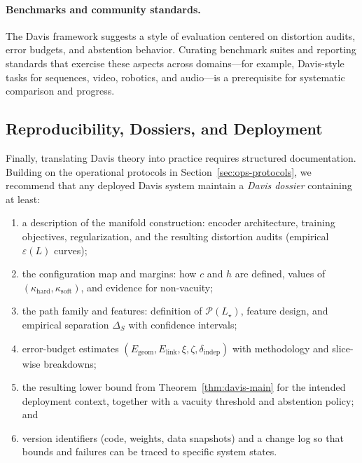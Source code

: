 \documentclass[11pt]{article}
\begin{document}
\paragraph{Benchmarks and community standards.}
The Davis framework suggests a style of evaluation centered on distortion audits, error budgets,
and abstention behavior. Curating benchmark suites and reporting standards that exercise these
aspects across domains---for example, Davis-style tasks for sequences, video, robotics, and audio---is
a prerequisite for systematic comparison and progress.

\subsection{Reproducibility, Dossiers, and Deployment}

Finally, translating Davis theory into practice requires structured documentation. Building on the
operational protocols in Section~\ref{sec:ops-protocols}, we recommend that any deployed Davis
system maintain a \emph{Davis dossier} containing at least:

\begin{enumerate}[label=(D\arabic*),leftmargin=1.7em,itemsep=2pt,topsep=2pt]
  \item a description of the manifold construction: encoder architecture, training objectives,
        regularization, and the resulting distortion audits (empirical $\varepsilon(L)$ curves);
  \item the configuration map and margins: how $c$ and $h$ are defined, values of
        $(\kappa_{\mathrm{hard}},\kappa_{\mathrm{soft}})$, and evidence for non-vacuity;
  \item the path family and features: definition of $\mathcal{P}(L_\star)$, feature design, and empirical
        separation $\Delta_S$ with confidence intervals;
  \item error-budget estimates $(E_{\mathrm{geom}},E_{\mathrm{link}},\xi,\zeta,\delta_{\mathrm{indep}})$ with
        methodology and slice-wise breakdowns;
  \item the resulting lower bound from Theorem~\ref{thm:davis-main} for the intended deployment
        context, together with a vacuity threshold and abstention policy; and
  \item version identifiers (code, weights, data snapshots) and a change log so that bounds and
        failures can be traced to specific system states.
\end{enumerate}
\end{document}
